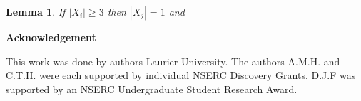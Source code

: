 \documentclass[12pt]{article}
\newtheorem{Lemma}[Theorem]{Lemma}
\begin{document}
\begin{Lemma}\label{lem:xi-xi2-xi3-clique}
If $|X_i| \geq 3$ then $|X_j| = 1$ and 
\end{Lemma}

\begin{center}
{\bf Acknowledgement}
\end{center}
This work was done by authors  Laurier University. The authors A.M.H. and C.T.H. were each supported by individual NSERC Discovery Grants. D.J.F was supported by an NSERC Undergraduate Student Research Award.


\clearpage
\begin{thebibliography}{99}

\end{thebibliography}
\end{document}
